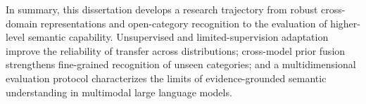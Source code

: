 \begin{eabstract}
In summary, this dissertation develops a research trajectory from robust cross-domain representations and open-category recognition to the evaluation of higher-level semantic capability. Unsupervised and limited-supervision adaptation improve the reliability of transfer across distributions; cross-model prior fusion strengthens fine-grained recognition of unseen categories; and a multidimensional evaluation protocol characterizes the limits of evidence-grounded semantic understanding in multimodal large language models.
  
  \end{eabstract}
